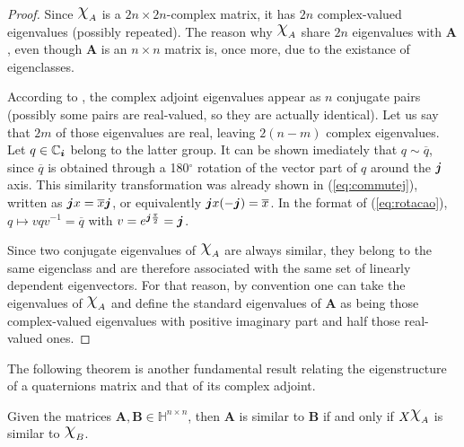 \begin{proof}
Since $\rchi_A$ is a $ 2n \times 2n $-complex matrix, it has $ 2n $ complex-valued eigenvalues (possibly repeated). The reason why $\rchi_A$ share $2n$ eigenvalues with $\mathbf{A}$, even though $\mathbf{A}$ is an $ n \times n $ matrix is, once more, due to the existance of eigenclasses.

According to \cite[Theorem 5]{lee1948eigenvalues}, the complex adjoint eigenvalues appear as $ n $ conjugate pairs (possibly some pairs are real-valued, so they are actually identical). Let us say that $2m$ of those eigenvalues are real, leaving $2(n-m)$ complex eigenvalues. Let $ q \in \mathbb{C}_{\boldsymbol{i}}$ belong to the latter group. It can be shown imediately that $ q \sim \overline{q} $, since $ \overline{q} $ is obtained through a 180$ ^\circ $ rotation of the vector part of $ q $ around the $ \boldsymbol{j} $ axis. This similarity transformation was already shown in (\ref{eq:commutej}), written as $\boldsymbol{j} x = \overline{x} \boldsymbol{j}$, or equivalently $\boldsymbol{j} x (-\boldsymbol{j})= \overline{x}$. In the format of (\ref{eq:rotacao}), $ q \mapsto v q v^{-1} = \overline{q}$ with $ v = e^{\boldsymbol{j} \frac{\pi}{2}} = \boldsymbol{j} $.

Since two conjugate eigenvalues of $ \rchi_A $ are always similar, they belong to the same eigenclass and are therefore associated with the same set of linearly dependent eigenvectors. For that reason, by convention one can take the eigenvalues of $ \rchi_A $ and define the standard eigenvalues of $\mathbf{A}$ as being those complex-valued eigenvalues with positive imaginary part and half those real-valued ones.
\end{proof}

The following theorem is another fundamental result relating the eigenstructure of a quaternions matrix and that of its complex adjoint.

\begin{theorem}
\label{th:diagonal}
Given the matrices $ \mathbf{A}, \mathbf{B} \in \mathbb{H}^{n \times n} $, then $ \mathbf{A} $ is similar to $ \mathbf{B} $ if and only if $ X\rchi_A $ is similar to $ \rchi_B $.
\end{theorem}

